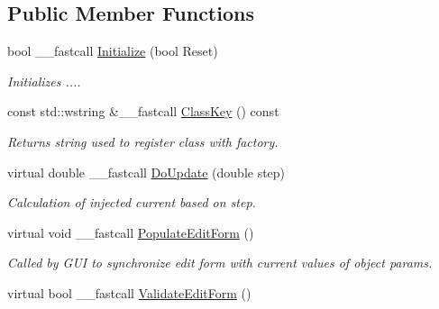 \subsection*{Public Member Functions}
\begin{DoxyCompactItemize}
\item 
\hypertarget{class_t_injection_electrode_ae39c315dc50e675e69681aaf5efb9bb6}{bool \+\_\+\+\_\+fastcall \hyperlink{class_t_injection_electrode_ae39c315dc50e675e69681aaf5efb9bb6}{Initialize} (bool Reset)}\label{class_t_injection_electrode_ae39c315dc50e675e69681aaf5efb9bb6}

\begin{DoxyCompactList}\small\item\em Initializes .... \end{DoxyCompactList}\item 
const std\+::wstring \&\+\_\+\+\_\+fastcall \hyperlink{class_t_injection_electrode_ad13dada3837856466fd9321afee58166}{Class\+Key} () const 
\begin{DoxyCompactList}\small\item\em Returns string used to register class with factory. \end{DoxyCompactList}\item 
virtual double \+\_\+\+\_\+fastcall \hyperlink{class_t_injection_electrode_a4d5b8d7c4c1dc5d9290ca8456c3be24b}{Do\+Update} (double step)
\begin{DoxyCompactList}\small\item\em Calculation of injected current based on step. \end{DoxyCompactList}\item 
\hypertarget{class_t_injection_electrode_a48a2e40fcd0a954b99dc7b70a930befc}{virtual void \+\_\+\+\_\+fastcall \hyperlink{class_t_injection_electrode_a48a2e40fcd0a954b99dc7b70a930befc}{Populate\+Edit\+Form} ()}\label{class_t_injection_electrode_a48a2e40fcd0a954b99dc7b70a930befc}

\begin{DoxyCompactList}\small\item\em Called by G\+U\+I to synchronize edit form with current values of object params. \end{DoxyCompactList}\item 
\hypertarget{class_t_injection_electrode_afd51d63f30eb2fbdb2c53ca09e11714e}{virtual bool \+\_\+\+\_\+fastcall \hyperlink{class_t_injection_electrode_afd51d63f30eb2fbdb2c53ca09e11714e}{Validate\+Edit\+Form} ()}\label{class_t_injection_electrode_afd51d63f30eb2fbdb2c53ca09e11714e}


\end{DoxyCompactItemize}
